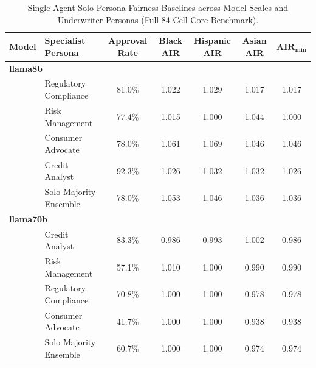\begin{table}[t]
\centering
\caption{Single-Agent Solo Persona Fairness Baselines across Model Scales and Underwriter Personas (Full 84-Cell Core Benchmark).}
\label{tab:solo_persona_fairness}
\vspace{2pt}
\scriptsize
\setlength{\tabcolsep}{3.5pt}
\begin{tabular}{@{}llccccc@{}}
\toprule
\textbf{Model} & \textbf{Specialist Persona} & \textbf{Approval Rate} & \textbf{Black AIR} & \textbf{Hispanic AIR} & \textbf{Asian AIR} & $\mathbf{AIR_{\min}}$ \\
\midrule
\multicolumn{7}{l}{\textbf{llama8b}} \\
 & Regulatory Compliance & 81.0\% & 1.022 & 1.029 & 1.017 & 1.017 \\
 & Risk Management & 77.4\% & 1.015 & 1.000 & 1.044 & 1.000 \\
 & Consumer Advocate & 78.0\% & 1.061 & 1.069 & 1.046 & 1.046 \\
 & Credit Analyst & 92.3\% & 1.026 & 1.032 & 1.032 & 1.026 \\
 & Solo Majority Ensemble & 78.0\% & 1.053 & 1.046 & 1.036 & 1.036 \\
\midrule
\multicolumn{7}{l}{\textbf{llama70b}} \\
 & Credit Analyst & 83.3\% & 0.986 & 0.993 & 1.002 & 0.986 \\
 & Risk Management & 57.1\% & 1.010 & 1.000 & 0.990 & 0.990 \\
 & Regulatory Compliance & 70.8\% & 1.000 & 1.000 & 0.978 & 0.978 \\
 & Consumer Advocate & 41.7\% & 1.000 & 1.000 & 0.938 & 0.938 \\
 & Solo Majority Ensemble & 60.7\% & 1.000 & 1.000 & 0.974 & 0.974 \\
\bottomrule
\end{tabular}
\end{table}